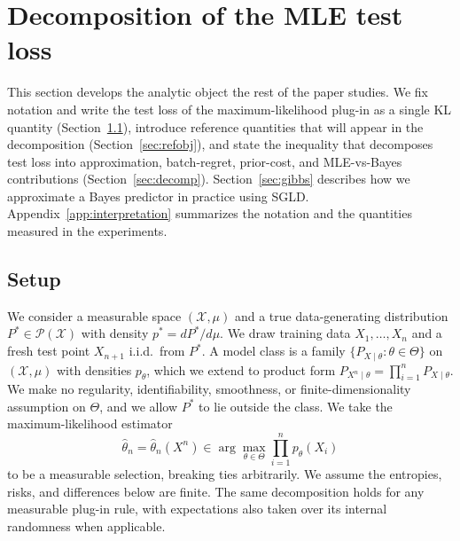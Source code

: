 
\section{Decomposition of the MLE test loss}
\label{sec:methods}

This section develops the analytic object the rest of the paper studies. We fix
notation and write the test loss of the maximum-likelihood plug-in as a single KL
quantity (Section~\ref{sec:setup}), introduce reference quantities that will
appear in the decomposition (Section~\ref{sec:refobj}), and state the inequality
that decomposes test loss into approximation, batch-regret, prior-cost, and MLE-vs-Bayes
contributions (Section~\ref{sec:decomp}). Section~\ref{sec:gibbs} describes how
we approximate a Bayes predictor in practice using SGLD.
Appendix~\ref{app:interpretation} summarizes the notation and the quantities
measured in the experiments.

\subsection{Setup}
\label{sec:setup}

We consider a measurable space $(\mathcal{X},\mu)$ and a true data-generating
distribution $P^*\in\mathcal{P}(\mathcal{X})$ with density $p^*=dP^*/d\mu$.
We draw training data $X_1,\dots,X_n$ and a fresh test point $X_{n+1}$ i.i.d.\
from $P^*$. A model class is a family
$\{P_{X\mid\theta}:\theta\in\Theta\}$ on $(\mathcal{X},\mu)$ with densities
$p_\theta$, which we extend to product form
$P_{X^n\mid\theta}=\prod_{i=1}^n P_{X\mid\theta}$. We make no regularity,
identifiability, smoothness, or finite-dimensionality assumption on $\Theta$, and
we allow $P^*$ to lie outside the class. We take the maximum-likelihood
estimator
\begin{equation*}
\hat\theta_n=\hat\theta_n(X^n)\in\arg\max_{\theta\in\Theta}\prod_{i=1}^n p_\theta(X_i)
\end{equation*}
to be a measurable selection, breaking ties arbitrarily. We assume the
entropies, risks, and differences below are finite. The same decomposition holds for any
measurable plug-in rule, with expectations also taken over its internal
randomness when applicable.

